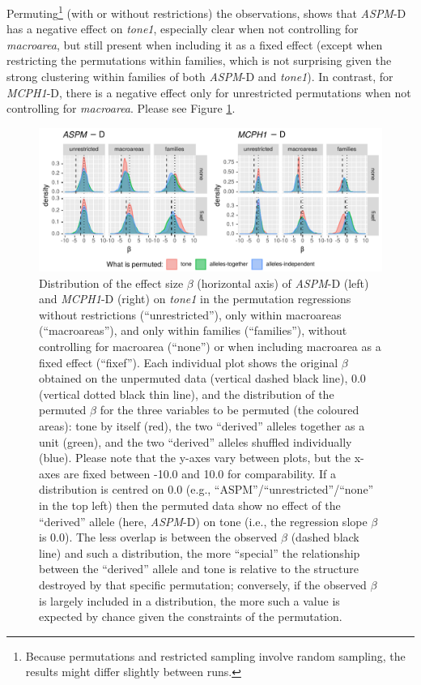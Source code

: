 \documentclass[twoside,onecolumn]{article}
\begin{document}
Permuting\footnote{Because permutations and restricted sampling involve random sampling, the results might differ slightly between runs.} (with or without restrictions) the observations, shows that \textit{ASPM}-D has a negative effect on \textit{tone1}, especially clear when not controlling for \textit{macroarea}, but still present when including it as a fixed effect (except when restricting the permutations within families, which is not surprising given the strong clustering within families of both \textit{ASPM}-D and \textit{tone1}).
In contrast, for \textit{MCPH1}-D, there is a negative effect only for unrestricted permutations when not controlling for \textit{macroarea}.
Please see Figure \ref{Fig:tone1_regressions_permuted}.

\begin{figure}[h]
  \centering
  \includegraphics[width=\textwidth]{../../code/figures/tone1_regressions_permuted}
  \caption{Distribution of the effect size $\beta$ (horizontal axis) of \textit{ASPM}-D (left) and \textit{MCPH1}-D (right) on \textit{tone1} in the permutation regressions without restrictions (``unrestricted''), only within macroareas (``macroareas''), and only within families (``families''), without controlling for macroarea (``none'') or when including macroarea as a fixed effect (``fixef''). Each individual plot shows the original $\beta$ obtained on the unpermuted data (vertical dashed black line), 0.0 (vertical dotted black thin line), and the distribution of the permuted $\beta$ for the three variables to be permuted (the coloured areas): tone by itself (red), the two ``derived'' alleles together as a unit (green), and the two ``derived'' alleles shuffled individually (blue). Please note that the y-axes vary between plots, but the x-axes are fixed between -10.0 and 10.0 for comparability. If a distribution is centred on 0.0 (e.g., ``ASPM''/``unrestricted''/``none'' in the top left) then the permuted data show no effect of the ``derived'' allele (here, \textit{ASPM}-D) on tone (i.e., the regression slope $\beta$ is 0.0). The less overlap is between the observed $\beta$ (dashed black line) and such a distribution, the more ``special'' the relationship between the ``derived'' allele and tone is relative to the structure destroyed by that specific permutation; conversely, if the observed $\beta$ is largely included in a distribution, the more such a value is expected by chance given the constraints of the permutation.}
  \label{Fig:tone1_regressions_permuted}
\end{figure}
\end{document}
